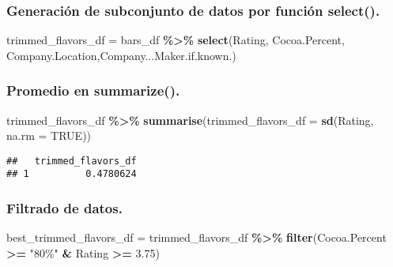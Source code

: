 \documentclass[
]{article}
\newenvironment{Shaded}{\begin{snugshade}}{\end{snugshade}}
\newcommand{\AttributeTok}[1]{\textcolor[rgb]{0.13,0.29,0.53}{#1}}
\newcommand{\ConstantTok}[1]{\textcolor[rgb]{0.56,0.35,0.01}{#1}}
\newcommand{\FloatTok}[1]{\textcolor[rgb]{0.00,0.00,0.81}{#1}}
\newcommand{\FunctionTok}[1]{\textcolor[rgb]{0.13,0.29,0.53}{\textbf{#1}}}
\newcommand{\NormalTok}[1]{#1}
\newcommand{\OtherTok}[1]{\textcolor[rgb]{0.56,0.35,0.01}{#1}}
\newcommand{\SpecialCharTok}[1]{\textcolor[rgb]{0.81,0.36,0.00}{\textbf{#1}}}
\newcommand{\StringTok}[1]{\textcolor[rgb]{0.31,0.60,0.02}{#1}}
\begin{document}
\subsubsection{Generación de subconjunto de datos por función
select().}\label{generaciuxf3n-de-subconjunto-de-datos-por-funciuxf3n-select.}

\begin{Shaded}
\begin{Highlighting}[]
\NormalTok{trimmed\_flavors\_df }\OtherTok{=}\NormalTok{ bars\_df }\SpecialCharTok{\%\textgreater{}\%} 
  \FunctionTok{select}\NormalTok{(Rating, Cocoa.Percent, Company.Location,Company...Maker.if.known.)}
\end{Highlighting}
\end{Shaded}

\subsubsection{Promedio en summarize().}\label{promedio-en-summarize.}

\begin{Shaded}
\begin{Highlighting}[]
\NormalTok{trimmed\_flavors\_df }\SpecialCharTok{\%\textgreater{}\%} 
  \FunctionTok{summarise}\NormalTok{(}\AttributeTok{trimmed\_flavors\_df =} \FunctionTok{sd}\NormalTok{(Rating, }\AttributeTok{na.rm =} \ConstantTok{TRUE}\NormalTok{))}
\end{Highlighting}
\end{Shaded}

\begin{verbatim}
##   trimmed_flavors_df
## 1          0.4780624
\end{verbatim}

\subsubsection{Filtrado de datos.}\label{filtrado-de-datos.}

\begin{Shaded}
\begin{Highlighting}[]
\NormalTok{best\_trimmed\_flavors\_df  }\OtherTok{=}\NormalTok{ trimmed\_flavors\_df }\SpecialCharTok{\%\textgreater{}\%} 
  \FunctionTok{filter}\NormalTok{(Cocoa.Percent }\SpecialCharTok{\textgreater{}=} \StringTok{"80\%"} \SpecialCharTok{\&}\NormalTok{ Rating }\SpecialCharTok{\textgreater{}=} \FloatTok{3.75}\NormalTok{)}
\end{Highlighting}
\end{Shaded}
\end{document}

